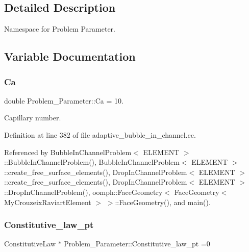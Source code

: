 \subsection{Detailed Description}
Namespace for Problem Parameter. 

\subsection{Variable Documentation}
\mbox{\label{namespaceProblem__Parameter_af6194d2571881779c678fbabc1503d47}} 
\subsubsection{\texorpdfstring{Ca}{Ca}}
{\footnotesize\ttfamily double Problem\+\_\+\+Parameter\+::\+Ca = 10.}



Capillary number. 



Definition at line 382 of file adaptive\+\_\+bubble\+\_\+in\+\_\+channel.\+cc.



Referenced by Bubble\+In\+Channel\+Problem$<$ E\+L\+E\+M\+E\+N\+T $>$\+::\+Bubble\+In\+Channel\+Problem(), Bubble\+In\+Channel\+Problem$<$ E\+L\+E\+M\+E\+N\+T $>$\+::create\+\_\+free\+\_\+surface\+\_\+elements(), Drop\+In\+Channel\+Problem$<$ E\+L\+E\+M\+E\+N\+T $>$\+::create\+\_\+free\+\_\+surface\+\_\+elements(), Drop\+In\+Channel\+Problem$<$ E\+L\+E\+M\+E\+N\+T $>$\+::\+Drop\+In\+Channel\+Problem(), oomph\+::\+Face\+Geometry$<$ Face\+Geometry$<$ My\+Crouzeix\+Raviart\+Element $>$ $>$\+::\+Face\+Geometry(), and main().

\mbox{\label{namespaceProblem__Parameter_a810f05c8d3e3331aed75643557d1057c}} 
\subsubsection{\texorpdfstring{Constitutive\+\_\+law\+\_\+pt}{Constitutive\_law\_pt}}
{\footnotesize\ttfamily Constitutive\+Law $\ast$ Problem\+\_\+\+Parameter\+::\+Constitutive\+\_\+law\+\_\+pt =0}



